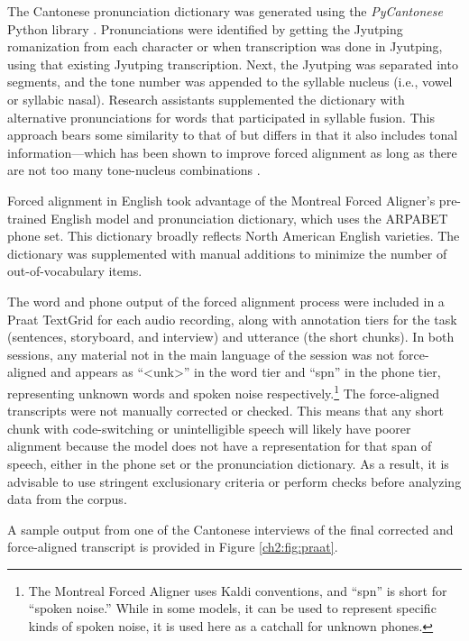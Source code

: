 The Cantonese pronunciation dictionary was generated using the \textit{PyCantonese} Python library \citep{lee_2018_pycantonese}. Pronunciations were identified by getting the Jyutping romanization from each character or when transcription was done in Jyutping, using that existing Jyutping transcription. Next, the Jyutping was separated into segments, and the tone number was appended to the syllable nucleus (i.e., vowel or syllabic nasal). Research assistants supplemented the dictionary with alternative pronunciations for words that participated in syllable fusion. This approach bears some similarity to that of \citet{tse_2019_heritage} but differs in that it also includes tonal information---which has been shown to improve forced alignment as long as there are not too many tone-nucleus combinations \citep{cavar_2016_endangered, yuan_2014_automatic}.

Forced alignment in English took advantage of the Montreal Forced Aligner's pre-trained English model and pronunciation dictionary, which uses the ARPABET phone set. This dictionary broadly reflects North American English varieties. The dictionary was supplemented with manual additions to minimize the number of out-of-vocabulary items.

The word and phone output of the forced alignment process were included in a Praat TextGrid for each audio recording, along with annotation tiers for the task (sentences, storyboard, and interview) and utterance (the short chunks). In both sessions, any material not in the main language of the session was not force-aligned and appears as ``<unk>'' in the word tier and ``spn'' in the phone tier, representing unknown words and spoken noise respectively.\footnote{The Montreal Forced Aligner uses Kaldi conventions, and ``spn'' is short for ``spoken noise.'' While in some models, it can be used to represent specific kinds of spoken noise, it is used here as a catchall for unknown phones.} The force-aligned transcripts were not manually corrected or checked. This means that any short chunk with code-switching or unintelligible speech will likely have poorer alignment because the model does not have a representation for that span of speech, either in the phone set or the pronunciation dictionary. As a result, it is advisable to use stringent exclusionary criteria or perform checks before analyzing data from the corpus. 

A sample output from one of the Cantonese interviews of the final corrected and force-aligned transcript is provided in Figure \ref{ch2:fig:praat}.

